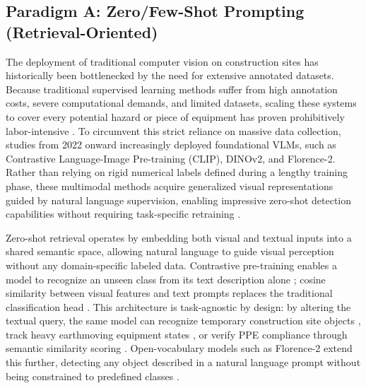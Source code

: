 \documentclass[10pt,letterpaper]{article}
\begin{document}
\begin{figure}[H]
\end{figure}

\subsection{Paradigm A: Zero/Few-Shot Prompting (Retrieval-Oriented)}

The deployment of traditional computer vision on construction sites has historically been bottlenecked by the need for extensive annotated datasets. Because traditional supervised learning methods suffer from high annotation costs, severe computational demands, and limited datasets, scaling these systems to cover every potential hazard or piece of equipment has proven prohibitively labor-intensive \cite{zhang2025}. To circumvent this strict reliance on massive data collection, studies from 2022 onward increasingly deployed foundational VLMs, such as Contrastive Language-Image Pre-training (CLIP), DINOv2, and Florence-2. Rather than relying on rigid numerical labels defined during a lengthy training phase, these multimodal methods acquire generalized visual representations guided by natural language supervision, enabling impressive zero-shot detection capabilities without requiring task-specific retraining \cite{zhang2025}.

Zero-shot retrieval operates by embedding both visual and textual inputs into a shared semantic space, allowing natural language to guide visual perception without any domain-specific labeled data. Contrastive pre-training enables a model to recognize an unseen class from its text description alone \cite{gil2024}; cosine similarity between visual features and text prompts replaces the traditional classification head \cite{liang2024}. This architecture is task-agnostic by design: by altering the textual query, the same model can recognize temporary construction site objects \cite{liang2024}, track heavy earthmoving equipment states \cite{jeoung2025}, or verify PPE compliance through semantic similarity scoring \cite{gil2024}. Open-vocabulary models such as Florence-2 extend this further, detecting any object described in a natural language prompt without being constrained to predefined classes \cite{jeoung2025}.
\end{document}
